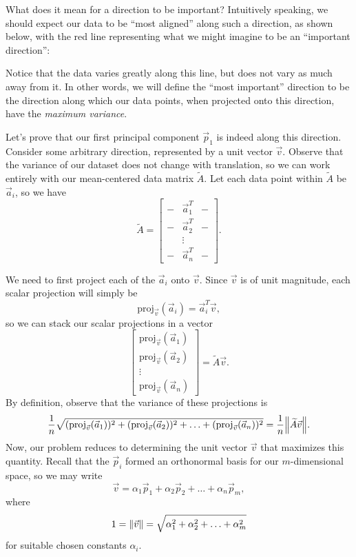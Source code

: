 \documentclass[letterpaper]{article}
\theoremstyle{remark}
\renewcommand{\tilde}[1]{\widetilde{#1}}
\newcommand{\mat}[1]{\ensuremath{\begin{bmatrix}#1\end{bmatrix}}}
\begin{document}
What does it mean for a direction to be important? Intuitively speaking, we should expect our data to be ``most aligned'' along such a direction, as shown below, with the red line representing what we might imagine to be an ``important direction'':
\begin{center}
\end{center}
Notice that the data varies greatly along this line, but does not vary as much away from it. In other words, we will define the ``most important'' direction to be the direction along which our data points, when projected onto this direction, have the \emph{maximum variance}.

Let's prove that our first principal component $\vec{p}_1$ is indeed along this direction. Consider some arbitrary direction, represented by a unit vector $\vec{v}$. Observe that the variance of our dataset does not change with translation, so we can work entirely with our mean-centered data matrix $\tilde{A}$. Let each data point within $\tilde{A}$ be $\vec{a}_i$, so we have
\[
    \tilde{A} = \mat{- & \vec{a}_1^T & - \\ - & \vec{a}_2^T & - \\ & \vdots & \\ - & \vec{a}_n^T & -}.
\]

We need to first project each of the $\vec{a}_i$ onto $\vec{v}$. Since $\vec{v}$ is of unit magnitude, each scalar projection will simply be
\[
    \mathrm{proj}_{\vec{v}}(\vec{a}_i) = \vec{a}_i^T \vec{v},
\]
so we can stack our scalar projections in a vector
\[
    \mat{\mathrm{proj}_{\vec{v}}(\vec{a}_1) \\ \mathrm{proj}_{\vec{v}}(\vec{a}_2) \\ \vdots \\ \mathrm{proj}_{\vec{v}}(\vec{a}_n)} = \tilde{A}\vec{v}.
\]
By definition, observe that the variance of these projections is
\[
    \frac{1}{n} \sqrt{(\mathrm{proj}_{\vec{v}}(\vec{a}_1))^2 + (\mathrm{proj}_{\vec{v}}(\vec{a}_2))^2 + \ldots + (\mathrm{proj}_{\vec{v}}(\vec{a}_n))^2} = \frac{1}{n}\norm{\tilde{A}\vec{v}}.
\]
Now, our problem reduces to determining the unit vector $\vec{v}$ that maximizes this quantity. Recall that the $\vec{p}_i$ formed an orthonormal basis for our $m$-dimensional space, so we may write
\[
    \vec{v} = \alpha_1 \vec{p}_1 + \alpha_2 \vec{p}_2 + \ldots + \alpha_n \vec{p}_m,
\]
where
\[
    1 = \norm{\vec{v}} = \sqrt{\alpha_1^2 + \alpha_2^2 + \ldots + \alpha_m^2}
\]
for suitable chosen constants $\alpha_i$. 
\end{document}
